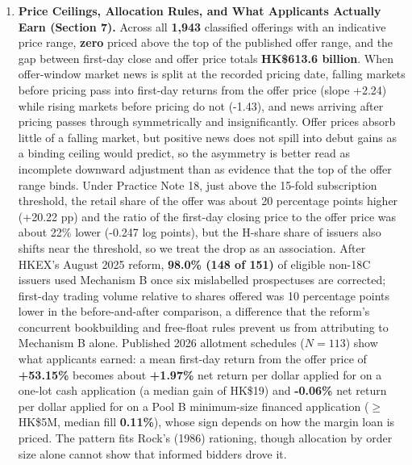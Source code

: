 \documentclass[11pt,letterpaper]{article}
\begin{document}
\begin{enumerate}
\item \textbf{Price Ceilings, Allocation Rules, and What Applicants Actually Earn (Section 7).} Across all \textbf{1,943} classified offerings with an indicative price range, \textbf{zero} priced above the top of the published offer range, and the gap between first-day close and offer price totals \textbf{HK\$613.6 billion}. When offer-window market news is split at the recorded pricing date, falling markets before pricing pass into first-day returns from the offer price (slope +2.24) while rising markets before pricing do not (-1.43), and news arriving after pricing passes through symmetrically and insignificantly. Offer prices absorb little of a falling market, but positive news does not spill into debut gains as a binding ceiling would predict, so the asymmetry is better read as incomplete downward adjustment than as evidence that the top of the offer range binds. Under Practice Note 18, just above the 15-fold subscription threshold, the retail share of the offer was about 20 percentage points higher (+20.22 pp) and the ratio of the first-day closing price to the offer price was about 22\% lower (-0.247 log points), but the H-share share of issuers also shifts near the threshold, so we treat the drop as an association. After HKEX's August 2025 reform, \textbf{98.0\% (148 of 151)} of eligible non-18C issuers used Mechanism B once six mislabelled prospectuses are corrected; first-day trading volume relative to shares offered was 10 percentage points lower in the before-and-after comparison, a difference that the reform's concurrent bookbuilding and free-float rules prevent us from attributing to Mechanism B alone. Published 2026 allotment schedules ($N = 113$) show what applicants earned: a mean first-day return from the offer price of \textbf{+53.15\%} becomes about \textbf{+1.97\%} net return per dollar applied for on a one-lot cash application (a median gain of HK\$19) and \textbf{-0.06\%} net return per dollar applied for on a Pool B minimum-size financed application ($\ge$ HK\$5M, median fill \textbf{0.11\%}), whose sign depends on how the margin loan is priced. The pattern fits Rock's (1986) rationing, though allocation by order size alone cannot show that informed bidders drove it.

\end{enumerate}
\end{document}
